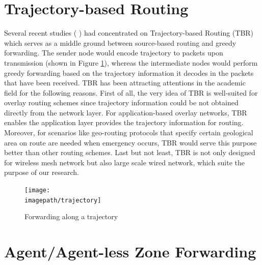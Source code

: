 \documentclass[conference]{IEEEtran}
\newcommand{\imagepath}{../../images/external/location_routing}
\begin{document}

\section{Trajectory-based Routing}

Several recent studies ( \cite{Niculescu2003} \cite{Niculescu2004} \cite{Yuksel2006} ) had concentrated on Trajectory-based Routing (TBR) which serves as a middle ground between source-based routing and greedy forwarding. The sender node would encode trajectory to packets upon transmission (shown in Figure \ref{fig:trajectory}), whereas the intermediate nodes would perform greedy forwarding based on the trajectory information it decodes in the 
packets that have been received. TBR has been attracting attentions in the academic field for the following reasons. First of all, the very idea of TBR is well-suited for overlay routing schemes since trajectory information could be not obtained directly from the network layer. For application-based overlay networks, TBR enables
the application layer provides the trajectory information for routing. Moreover, for scenarios like geo-routing protocols that specify certain geological area on route are needed when emergency occurs, TBR would serve this purpose better than other routing schemes. Last but not least, TBR is not only designed for wireless mesh network but also 
large scale wired network, which suite the purpose of our research.

\begin{figure}
\label{fig:trajectory}
\centering
\texttt{[image: \\imagepath/trajectory]}
\caption{Forwarding along a trajectory}
\end{figure}

\section{Agent/Agent-less Zone Forwarding}
\end{document}
